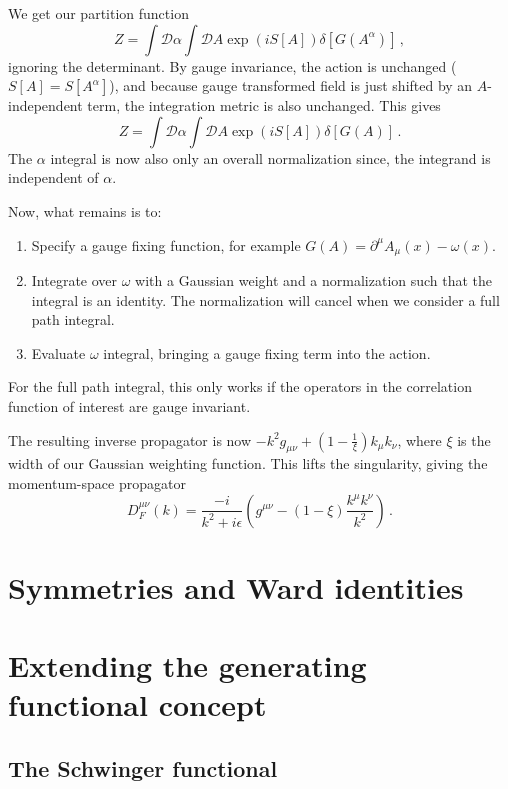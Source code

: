 \documentclass[12pt]{memoir}
\begin{document}
We get our partition function
\begin{equation}
  Z = \int \mathcal{D}\alpha \int \mathcal{D}A \exp(i S[A]) \delta [G(A^{\alpha})]\,,
\end{equation}
ignoring the determinant.
By gauge invariance, the action is unchanged ($S[A] = S[A^{\alpha}]$),
and because gauge transformed field is just shifted by an $A$-independent term,
the integration metric is also unchanged.
This gives
\begin{equation}
  Z = \int \mathcal{D}\alpha \int \mathcal{D}A \exp(i S[A]) \delta [G(A)]\,.
\end{equation}
The $\alpha$ integral is now also only an overall normalization since, the integrand is independent of $\alpha$.

Now, what remains is to:
\begin{enumerate}
  \item Specify a gauge fixing function, for example $G(A) = \partial^{\mu} A_{\mu}(x) - \omega(x)$.
  \item Integrate over $\omega$ with a Gaussian weight and a normalization such that the integral is an identity.
    The normalization will cancel when we consider a full path integral.
  \item Evaluate $\omega$ integral, bringing a gauge fixing term into the action.
\end{enumerate}
For the full path integral,
this only works if the operators in the correlation function of interest are gauge invariant.

The resulting inverse propagator is now $-k^2 g_{\mu\nu} + (1 - \frac{1}{\xi})k_{\mu} k_{\nu}$,
where $\xi$ is the width of our Gaussian weighting function.
This lifts the singularity,
giving the momentum-space propagator
\begin{equation}
  D_{F}^{\mu\nu}(k) = \frac{-i}{k^2 + i \epsilon}\left(g^{\mu\nu} - (1 - \xi) \frac{k^{\mu}k^{\nu}}{k^2}\right)\,.
\end{equation}

\section{Symmetries and Ward identities}

\section{Extending the generating functional concept}

\subsection{The Schwinger functional}
\end{document}
